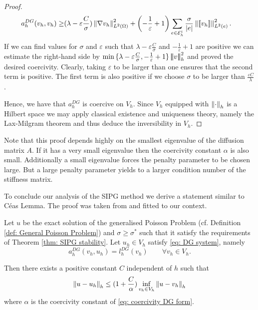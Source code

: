 \begin{proof}
	\begin{align*}
	a_h^{DG}(v_h,v_h)  \geq& (\lambda- \varepsilon \frac C \sigma)
	\left\lVert \nabla v_h \right\rVert_{L^2(\Omega)}^2
	+ \left(-\frac 1 \varepsilon +1\right) \sum_{e\in \mathcal{E}_h^i}  \frac \sigma {|e|} \left\lVert \llbracket v_h \rrbracket \right\rVert_{L^2(e)}^2.
	\end{align*}
	If we can find values for $\sigma$ and $\varepsilon$ such that $\lambda-\varepsilon \frac C \sigma$ and $-\frac 1 \varepsilon +1$ are positive we can estimate the right-hand side by $\min{\{\lambda-\varepsilon \frac C \sigma,-\frac 1 \varepsilon +1\}} \left| \! \left| \! \left| v \right| \! \right| \! \right|_{h}^2$ and proved the desired coercivity. 
	Clearly, taking $\varepsilon$ to be larger than one ensures that the second term is positive. The first term is also positive if we choose $\sigma$ to be larger than $\frac {\varepsilon C} \lambda$.
	
	Hence, we have that $a_h^{DG}$ is coercive on $V_h$. Since $V_h$ equipped with $\left\lVert \cdot \right\rVert_{h}$ is a Hilbert space we may apply classical existence and uniqueness theory, namely the Lax-Milgram theorem and thus deduce the inversibility in $V_h$.
\end{proof}
Note that this proof depends highly on the smallest eigenvalue of the diffusion matrix $A$. If it has a very small eigenvalue then the coercivity constant $\alpha$ is also small.
Additionally a small eigenvalue forces the penalty parameter to be chosen large. But a large penalty parameter yields to a larger condition number of the stiffness matrix.

To conclude our analysis of the SIPG method we derive a statement similar to C\'eas Lemma. The proof was taken from \cite[Lemma 10.5.2]{BS2002} and fitted to our context.
\begin{theorem}\label{thm: error estimate}
	Let $u$ be the exact solution of the generalised Poisson Problem (cf. Definition \ref{def: General Poisson Problem}) and $\sigma \geq \sigma^*$ such that it satisfy the requirements of Theorem \ref{thm: SIPG stability}. Let $u_h \in V_h$ satisfy \eqref{eq: DG system}, namely
	\[
	a_h^{DG}(v_h, u_h) = l^{DG}_h(v_h) \qquad \forall v_h \in V_h.
	\]
\end{theorem}
Then there exists a positive constant $C$ independent of $h$ such that 
\[
\left\lVert u - u_h  \right\rVert_{h} \leq (1+\frac C \alpha) \inf_{v_h \in V_h} \left\lVert u - v_h \right\rVert_{h}
\]
where $\alpha$ is the coercivity constant of \eqref{eq: coercivity DG form}. %

